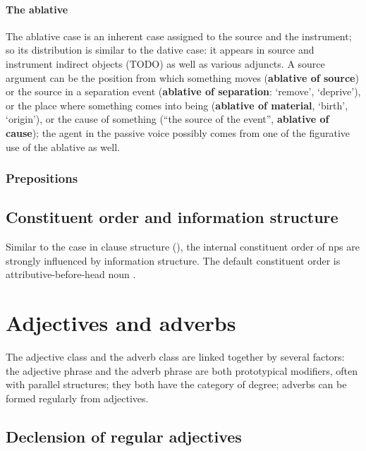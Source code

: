 \documentclass[a4paper, oneside]{report}
\newcommand*{\citepage}[1]{p.~{#1}}
\newcommand*{\concept}[1]{\textbf{#1}}
\newcommand{\translate}[1]{`#1'}
\begin{document}
\subsubsection{The ablative}

The ablative case is an inherent case assigned to 
the source and the instrument;
so its distribution is similar to the dative case: 
it appears in source and instrument indirect objects (TODO) 
as well as various adjuncts.
A source argument
can be the position from which something moves 
(\concept{ablative of source})
or the source in a separation event 
(\concept{ablative of separation}: \translate{remove}, \translate{deprive}),
or the place where something comes into being 
(\concept{ablative of material}, \translate{birth}, \translate{origin}), 
or the cause of something (``the source of the event'', \concept{ablative of cause});
the agent in the passive voice possibly 
comes from one of the figurative use of the ablative as well.

\subsection{Prepositions}

\section{Constituent order and information structure}

Similar to the case in clause structure (),
the internal constituent order of \acs{np}s are strongly influenced by 
information structure.
The default constituent order is attributive-before-head noun
\citep[\citepage{396}]{allen1903allen}.

\chapter{Adjectives and adverbs}

The adjective class and the adverb class are linked together by several factors:
the adjective phrase and the adverb phrase are both prototypical modifiers,
often with parallel structures;
they both have the category of degree; 
adverbs can be formed regularly from adjectives.

\section{Declension of regular adjectives}
\end{document}
